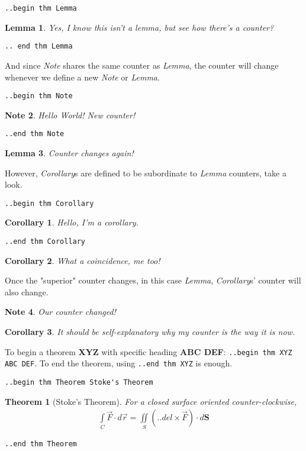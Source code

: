 \documentclass[12pt]{article}
\newtheorem*{Theorem}{Theorem}
\newtheorem{Lemma}{Lemma}
\newtheorem{Corollary}{Corollary}[Lemma]
\newtheorem{Note}[Lemma]{Note}
\begin{document}
\begin{flushleft}
\medskip
\verb|..begin thm Lemma|
\begin{Lemma}
Yes, I know this isn't a lemma, but see how there's a counter?
\end{Lemma}
\verb|.. end thm Lemma|
\medskip

And since \emph{Note} shares the same counter as \emph{Lemma}, the counter will change whenever we define
a new \emph{Note} or \emph{Lemma}.

\medskip
\verb|..begin thm Note|
\begin{Note}
Hello World! New counter!
\end{Note}
\verb|..end thm Note|
\medskip

\begin{Lemma}
Counter changes again!
\end{Lemma}

However, \emph{Corollary}s are defined to be subordinate to \emph{Lemma} counters, take a look.

\medskip
\verb|..begin thm Corollary|
\begin{Corollary}
Hello, I'm a corollary.
\end{Corollary}
\verb|..end thm Corollary|
\medskip

\begin{Corollary}
What a coincidence, me too!
\end{Corollary}

Once the "superior" counter changes, in this case \emph{Lemma}, \emph{Corollary}s' counter will also change.

\begin{Note}
Our counter changed!
\end{Note}

\begin{Corollary}
It should be self-explanatory why my counter is the way it is now.
\end{Corollary}

\bigskip
To begin a theorem \textbf{XYZ} with specific heading \textbf{ABC DEF}: \verb|..begin thm XYZ ABC DEF|. To end the theorem, using \verb|..end thm XYZ| is enough.

\medskip
\verb|..begin thm Theorem Stoke's Theorem|
\begin{Theorem}[Stoke's Theorem]
For a closed surface oriented counter-clockwise,
\begin{gather*}
\int\limits_C \vec{F} \cdot d\vec{r} = \iint\limits_S (..del \times \vec{F}) \cdot d\textbf{S} 
\end{gather*}
\end{Theorem}
\verb|..end thm Theorem|
\medskip


\end{flushleft}
\end{document}
